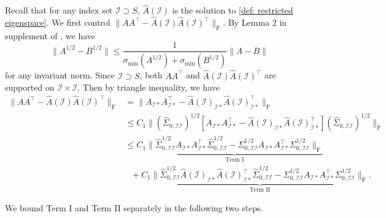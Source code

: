 \documentclass[11pt]{article}
\newcommand{\AI}{\widehat{A}(\cI)}
\newcommand{\cI}{{\mathcal{I}}}
\newcommand{\0}{{\mathbf{0}}}
\begin{document}
Recall that for any index set $\cI\supset S$,  $\widehat{A}(\cI)$ is the solution to \eqref{def: restricted eigenspace}.
We first control $\|AA^\top  -\AI\AI^\top  \|_\mathrm{F}$. 
By Lemma 2 in supplement of \cite{gao2017sparse}, we have
\begin{equation}
      \label{eq:sqrtnormbd}
    \|A^{1/2}-B^{1/2}\|\leq \frac{1}{\sigma_{\min}(A^{1/2})+\sigma_{\min}(B^{1/2})}\|A-B\|
    \end{equation}
for any invariant norm. 
Since $\cI\supset S$, both $AA^\top  $ and $\AI\AI^\top  $ are supported on $\cI\times \cI$. 
Then by triangle inequality, we have
\begin{align*}
\|AA^\top  -\AI\AI^\top  \|_\mathrm{F}
& = \|A_{\cI*}A^\top_{\cI*}-\AI_{\cI*}\AI^\top_{\cI*}\|_\mathrm{F}
\\
& \leq C_1\|(\widehat{\Sigma}_{0,\cI\cI})^{1/2}[A_{\cI*}A^\top_{\cI*}-\AI_{\cI*}\AI^\top_{\cI*}](\widehat{\Sigma}_{0,\cI\cI})^{1/2}\|_\mathrm{F}\\
& \leq C_1\underbrace{\|\widehat{\Sigma}_{0,\cI\cI}^{1/2}A_{\cI*}A^\top_{\cI*}\widehat{\Sigma}_{0,\cI\cI}^{1/2}-\Sigma_{0,\cI\cI}^{1/2}A_{\cI*}A^\top_{\cI*}\Sigma_{0,\cI\cI}^{1/2}\|_\mathrm{F}}_{\text{Term I}}
\\    &~~~ + C_1\underbrace{\|\widehat{\Sigma}_{0,\cI\cI}^{1/2}\AI_{\cI*}\AI^\top_{\cI*}\widehat{\Sigma}_{0,\cI\cI}^{1/2} - \Sigma_{0,\cI\cI}^{1/2}A_{\cI*}A^\top_{\cI*}\Sigma_{0,\cI\cI}^{1/2}\|_\mathrm{F}}_{\text{Term II}}.
\end{align*}

We bound Term I and Term II separately in the following two steps. 
\end{document}
